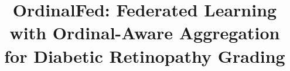 \documentclass[conference,a4paper]{IEEEtran}
\begin{document}
\title{OrdinalFed: Federated Learning with Ordinal-Aware
Aggregation for Diabetic Retinopathy Grading}


\maketitle









\end{document}
